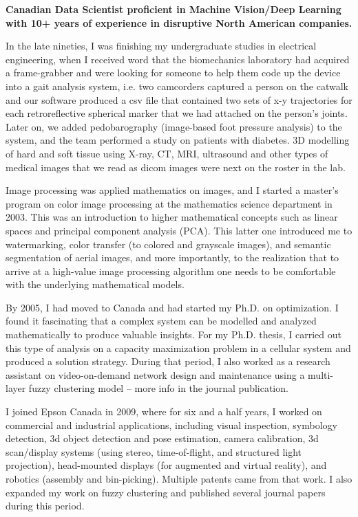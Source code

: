 \onehalfspace
\textbf{\large Canadian Data Scientist proficient in Machine Vision/Deep Learning with 10+ years of experience in disruptive North American companies.}
\singlespace

\vspace{0.8cm}

In the late nineties, I was finishing my undergraduate studies in electrical engineering, when I received word that the biomechanics laboratory had acquired a frame-grabber and were looking for someone to help them code up the device into a gait analysis system, i.e. two camcorders captured a person on the catwalk and our software produced a csv file that contained two sets of x-y trajectories for each retroreflective spherical marker that we had attached on the person's joints. Later on, we added pedobarography (image-based foot pressure analysis) to the system, and the team performed a study on patients with diabetes. 3D modelling of hard and soft tissue using X-ray, CT, MRI, ultrasound and other types of medical images that we read as dicom images were next on the roster in the lab.

\newcommand{\osspacing}{\vspace{0.5cm}}

\osspacing
Image processing was applied mathematics on images, and I started a master's program on color image processing at the mathematics science department in 2003. This was an introduction to higher mathematical concepts such as linear spaces and principal component analysis (PCA). This latter one introduced me to watermarking, color transfer (to colored and grayscale images), and semantic segmentation of aerial images, and more importantly, to the realization that to arrive at a high-value image processing algorithm one needs to be comfortable with the underlying mathematical models. 

\osspacing
By 2005, I had moved to Canada and had started my Ph.D. on optimization. I found it fascinating that a complex system can be modelled and analyzed mathematically to produce valuable insights. For my Ph.D. thesis, I carried out this type of analysis on a capacity maximization problem in a cellular system and produced a solution strategy. During that period, I also worked as a research assistant on video-on-demand network design and maintenance using a multi-layer fuzzy clustering model -- more info in the journal publication.

\osspacing
I joined Epson Canada in 2009, where for six and a half years, I worked on commercial and industrial applications, including visual inspection, symbology detection, 3d object detection and pose estimation, camera calibration, 3d scan/display systems (using stereo, time-of-flight, and structured light projection), head-mounted displays (for augmented and virtual reality), and robotics (assembly and bin-picking). Multiple patents came from that work. I also expanded my work on fuzzy clustering and published several journal papers during this period.

